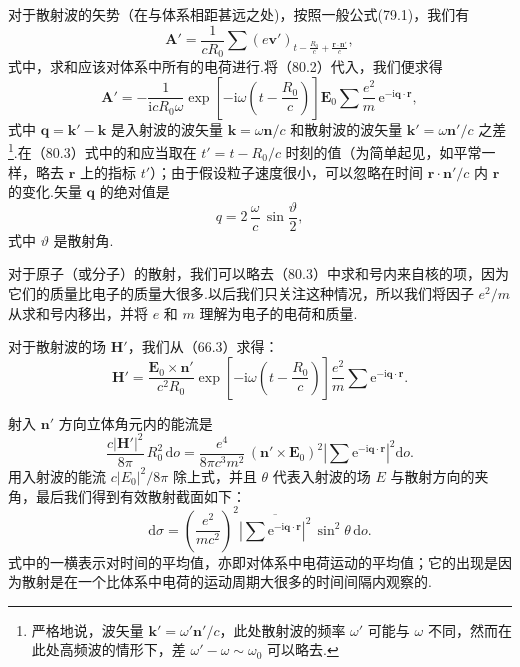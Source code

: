 对于散射波的矢势（在与体系相距甚远之处)，按照一般公式(79.1)，我们有
\begin{equation*}
  \boldsymbol{A}'=\frac{1}{cR_0}\sum
  \left(e\boldsymbol{v}'\right)_{t-\frac{R_0}{c}+\frac{\boldsymbol{r}\cdot\boldsymbol{n}'}{c}},
\end{equation*}
式中，求和应该对体系中所有的电荷进行.将（80.2）代入，我们便求得
\begin{equation}
  \boldsymbol{A}'=-\frac{1}{\mathrm{i}cR_0\omega}
  \exp\!\left[-\mathrm{i}\omega\left(t-\frac{R_0}{c}\right)\right]\boldsymbol{E}_0
  \sum\frac{e^2}{m}\,\mathrm{e}^{-\mathrm{i}\boldsymbol{q}\cdot\boldsymbol{r}},
\end{equation}
式中 $\boldsymbol{q}=\boldsymbol{k}'-\boldsymbol{k}$ 是入射波的波矢量 $\boldsymbol{k}=\omega\boldsymbol{n}/c$ 和散射波的波矢量 $\boldsymbol{k}'=\omega\boldsymbol{n}'/c$ 之差\footnote{严格地说，波矢量 $\boldsymbol{k}'=\omega'\boldsymbol{n}'/c$，此处散射波的频率 $\omega'$ 可能与 $\omega$ 不同，然而在此处高频波的情形下，差 $\omega'-\omega\sim\omega_0$ 可以略去.}.在（80.3）式中的和应当取在 $t'=t-R_0/c$ 时刻的值（为简单起见，如平常一样，略去 $\boldsymbol{r}$ 上的指标 $t'$）；由于假设粒子速度很小，可以忽略在时间 $\boldsymbol{r}\cdot\boldsymbol{n}'/c$ 内 $\boldsymbol{r}$ 的变化.矢量 $\boldsymbol{q}$ 的绝对值是
\begin{equation}
  q=2\,\frac{\omega}{c}\,\sin\frac{\vartheta}{2},
\end{equation}
式中 $\vartheta$ 是散射角.

对于原子（或分子）的散射，我们可以略去（80.3）中求和号内来自核的项，因为它们的质量比电子的质量大很多.以后我们只关注这种情况，所以我们将因子 $e^2/m$ 从求和号内移出，并将 $e$ 和 $m$ 理解为电子的电荷和质量.

对于散射波的场 $\boldsymbol{H}'$，我们从（66.3）求得：
\begin{equation}
  \boldsymbol{H}'=\frac{\boldsymbol{E}_0\times\boldsymbol{n}'}{c^2R_0}
  \exp\!\left[-\mathrm{i}\omega\left(t-\frac{R_0}{c}\right)\right]
  \frac{e^2}{m}\sum\mathrm{e}^{-\mathrm{i}\boldsymbol{q}\cdot\boldsymbol{r}}.
\end{equation}

射入 $\boldsymbol{n}'$ 方向立体角元内的能流是
\begin{equation*}
  \frac{c|\boldsymbol{H}'|^2}{8\pi}\,R_0^2\,\mathrm{d}o
  =\frac{e^4}{8\pi c^3m^2}\,(\boldsymbol{n}'\times\boldsymbol{E}_0)^2
  \left|\sum\mathrm{e}^{-\mathrm{i}\boldsymbol{q}\cdot\boldsymbol{r}}\right|^2\mathrm{d}o.
\end{equation*}
用入射波的能流 $c|E_0|^2/8\pi$ 除上式，并且 $\theta$ 代表入射波的场 $E$ 与散射方向的夹角，最后我们得到有效散射截面如下：
\begin{equation}
  \mathrm{d}\sigma=\left(\frac{e^2}{mc^2}\right)^{\!2}
  \overline{\left|\sum\mathrm{e}^{-\mathrm{i}\boldsymbol{q}\cdot\boldsymbol{r}}\right|^2}
  \,\sin^2\theta\,\mathrm{d}o.
\end{equation}
式中的一横表示对时间的平均值，亦即对体系中电荷运动的平均值；它的出现是因为散射是在一个比体系中电荷的运动周期大很多的时间间隔内观察的.

